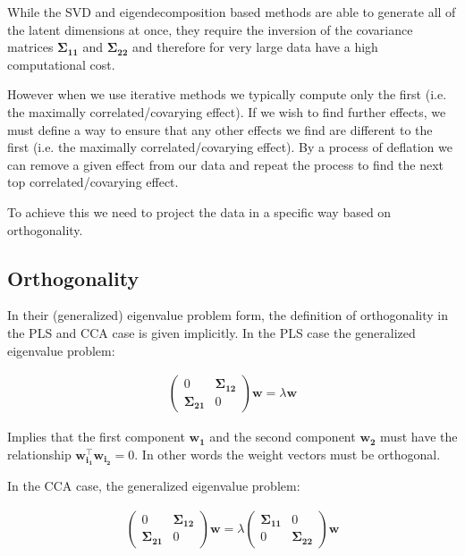 While the SVD and eigendecomposition based methods are able to generate all of the latent dimensions at once, they require the inversion of the covariance matrices $\mathbf{\Sigma_{11}}$ and $\mathbf{\Sigma_{22}}$ and therefore for very large data have a high computational cost.

However when we use iterative methods we typically compute only the first (i.e. the maximally correlated/covarying effect). If we wish to find further effects, we must define a way to ensure that any other effects we find are different to the first (i.e. the maximally correlated/covarying effect). By a process of deflation we can remove a given effect from our data and repeat the process to find the next top correlated/covarying effect.

To achieve this we need to project the data in a specific way based on orthogonality.

\subsection{Orthogonality}

In their (generalized) eigenvalue problem form, the definition of orthogonality in the PLS and CCA case is given implicitly. In the PLS case the generalized eigenvalue problem:

\begin{align}
    \begin{pmatrix}
        0                    & \mathbf{\Sigma_{12}} \\
        \mathbf{\Sigma_{21}} & 0
    \end{pmatrix}
    \mathbf{w}
    =
    \lambda
    \mathbf{w}
\end{align}

Implies that the first component $\mathbf{w_1}$ and the second component $\mathbf{w_2}$ must have the relationship $\mathbf{w_{i_1}^{\top} w_{i_2}}=0$. In other words the weight vectors must be orthogonal.

In the CCA case, the generalized eigenvalue problem:

\begin{align}
    \begin{pmatrix}
        0                    & \mathbf{\Sigma_{12}} \\
        \mathbf{\Sigma_{21}} & 0
    \end{pmatrix}
    \mathbf{w}
    =
    \lambda
    \begin{pmatrix}
        \mathbf{\Sigma_{11}} & 0                    \\
        0                    & \mathbf{\Sigma_{22}}
    \end{pmatrix}
    \mathbf{w}
\end{align}

